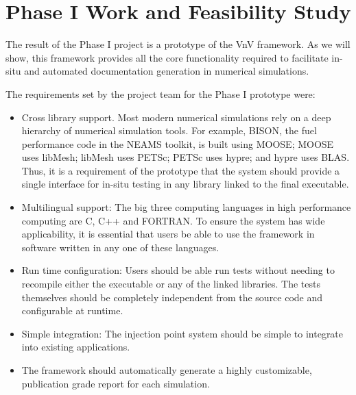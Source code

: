 \section{Phase I Work and Feasibility Study}

The result of the Phase I project is a prototype of the VnV framework. As we will show,
this framework provides all the core functionality required to facilitate in-situ \VV and automated 
documentation generation in numerical simulations. 

The requirements set by the project team for the Phase I prototype were:

\begin{itemize}
 \item Cross library support. Most modern numerical simulations rely on a deep hierarchy of numerical simulation tools. For example, BISON, the fuel performance code in the NEAMS toolkit, is built using MOOSE; MOOSE uses libMesh; libMesh uses PETSc; PETSc uses hypre; and hypre uses BLAS. Thus, it is a requirement of the prototype that the system should provide a single interface for in-situ testing in any library linked to the final executable. 
 \item Multilingual support: The big three computing languages in high performance computing are C, C++ and FORTRAN. To ensure the system has wide applicability, it is essential that users be able to use the framework in software written in any one of these languages. 
 \item Run time configuration: Users should be able run \VV tests without needing to recompile either the executable or any of the linked libraries. The tests themselves should be completely independent from the source code and configurable at runtime. 
 \item Simple integration: The injection point system should be simple to integrate into existing applications.
 \item The framework should automatically generate a highly customizable, publication grade \VV report for each simulation. 
\end{itemize}

